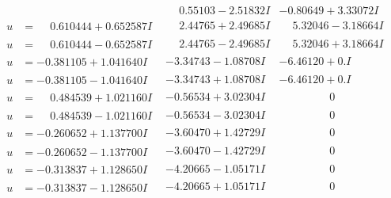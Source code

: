 \documentclass[1p]{elsarticle_modified}
\theoremstyle{definition}
\begin{document}
$$\begin{array}{c|c|c}
 & \phantom{-}0.55103 - 2.51832 I & -0.80649 + 3.33072 I \\ \hline\begin{aligned}
u &= \phantom{-}0.610444 + 0.652587 I\end{aligned}
 & \phantom{-}2.44765 + 2.49685 I & \phantom{-}5.32046 - 3.18664 I \\ \hline\begin{aligned}
u &= \phantom{-}0.610444 - 0.652587 I\end{aligned}
 & \phantom{-}2.44765 - 2.49685 I & \phantom{-}5.32046 + 3.18664 I \\ \hline\begin{aligned}
u &= -0.381105 + 1.041640 I\end{aligned}
 & -3.34743 - 1.08708 I & -6.46120 + 0. I\phantom{ +0.000000I} \\ \hline\begin{aligned}
u &= -0.381105 - 1.041640 I\end{aligned}
 & -3.34743 + 1.08708 I & -6.46120 + 0. I\phantom{ +0.000000I} \\ \hline\begin{aligned}
u &= \phantom{-}0.484539 + 1.021160 I\end{aligned}
 & -0.56534 + 3.02304 I & \phantom{-0.000000 } 0 \\ \hline\begin{aligned}
u &= \phantom{-}0.484539 - 1.021160 I\end{aligned}
 & -0.56534 - 3.02304 I & \phantom{-0.000000 } 0 \\ \hline\begin{aligned}
u &= -0.260652 + 1.137700 I\end{aligned}
 & -3.60470 + 1.42729 I & \phantom{-0.000000 } 0 \\ \hline\begin{aligned}
u &= -0.260652 - 1.137700 I\end{aligned}
 & -3.60470 - 1.42729 I & \phantom{-0.000000 } 0 \\ \hline\begin{aligned}
u &= -0.313837 + 1.128650 I\end{aligned}
 & -4.20665 - 1.05171 I & \phantom{-0.000000 } 0 \\ \hline\begin{aligned}
u &= -0.313837 - 1.128650 I\end{aligned}
 & -4.20665 + 1.05171 I & \phantom{-0.000000 } 0 \\ \hline\begin{aligned}

\end{aligned}
\end{array}$$
\end{document}
